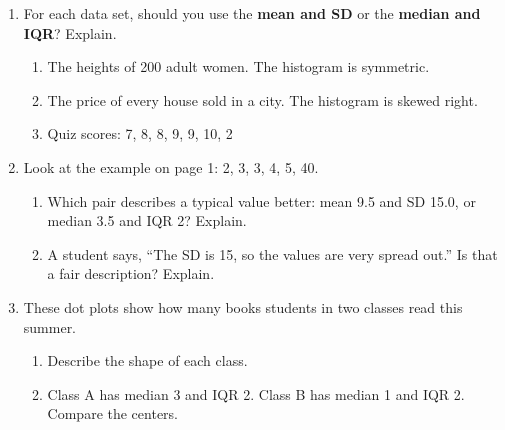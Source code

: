 \documentclass[11pt]{article}
\begin{document}
\newpage
\begin{enumerate}

\item For each data set, should you use the \textbf{mean and SD} or the \textbf{median and IQR}? Explain.
\begin{enumerate}[itemsep=4em]
  \item The heights of 200 adult women. The histogram is symmetric.

  \item The price of every house sold in a city. The histogram is skewed right.

  \item Quiz scores: 7, 8, 8, 9, 9, 10, 2

\end{enumerate}
\work{4em}

\item Look at the example on page 1: 2, 3, 3, 4, 5, 40.
\begin{enumerate}[itemsep=4em]
  \item Which pair describes a typical value better: mean 9.5 and SD 15.0, or median 3.5 and IQR 2? Explain.

  \item A student says, ``The SD is 15, so the values are very spread out.'' Is that a fair description? Explain.

\end{enumerate}
\work{4em}

\newpage
\item These dot plots show how many books students in two classes read this summer.
\begin{center}\end{center}
\begin{enumerate}[itemsep=5em]
  \item Describe the shape of each class.

  \item Class A has median 3 and IQR 2. Class B has median 1 and IQR 2. Compare the centers.


\end{enumerate}
\end{enumerate}
\end{document}

